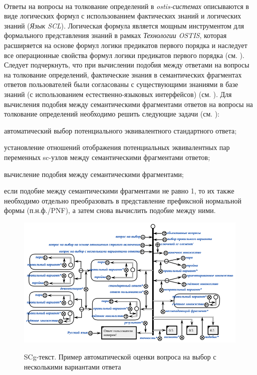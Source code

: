 ~\\
Ответы на вопросы на толкование определений в \textit{ostis-системах} описываются в виде логических формул с использованием фактических знаний и логических знаний (\textit{Язык SCL}). Логическая формула является мощным инструментом для формального представления знаний в рамках \textit{Технологии OSTIS}, которая расширяется на основе формул логики предикатов первого порядка и наследует все операционные свойства формул логики предикатов первого порядка (см. ). Следует подчеркнуть, что при вычислении подобия между ответами на вопросы на толкование определений, фактические знания в семантических фрагментах ответов пользователей были согласованы с существующими знаниями в базе знаний (с использованием естественно-языковых интерфейсов) (см. ). Для вычисления подобия между семантическими фрагментами ответов на вопросы на толкование определений необходимо решить следующие задачи (см. ):

\begin{textitemize}
	\item автоматический выбор потенциального эквивалентного стандартного ответа;
	\item установление отношений отображения потенциальных эквивалентных пар переменных sc-узлов между семантическими фрагментами ответов;
	\item вычисление подобия между семантическими фрагментами;
	\item если подобие между семантическими фрагментами не равно 1, то их также необходимо отдельно преобразовать в представление префиксной нормальной формы (п.н.ф./PNF), а затем снова вычислить подобие между ними.
\end{textitemize}

\begin{figure}[H]
	\caption{SCg-текст. Пример автоматической оценки вопроса на выбор с несколькими вариантами ответа}
	\includegraphics[scale=0.7]{author/part7/figures/answer_verification_example.png}
	\label{fig:AV_example}
\end{figure}

